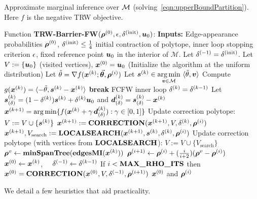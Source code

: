 \begin{algorithm}[t]
	\caption{Approximate marginal inference over $\mathcal{M}$ (solving~\eqref{eqn:upperBoundPartition}). Here $f$ is the negative TRW objective.}
	\label{alg:algInfadaptive}
	\begin{algorithmic}[1]
		\STATE Function \textbf{TRW-Barrier-FW}$(\bm{\rho}^{(0)}, \epsilon, \delta^{(\mathrm{init})},\bm{u}_0)$:
		\STATE \textbf{Inputs:} Edge-appearance probabilities $\bm{\rho}^{(0)}$, $\delta^{(\mathrm{init})}\leq \frac{1}{4}$ initial contraction of polytope, inner loop stopping criterion $\epsilon$, fixed reference point $\bm{u}_0$ in the interior of $\mathcal{M}$. Let $\delta^{(-1)} = \delta^{(\mathrm{init})}$.
		\STATE Let $V := \{\bm{u}_0\}$ (visited vertices),  $\bm{x}^{(0)} = \bm{u}_0$ \quad (Initialize the algorithm at the uniform distribution) 
			\STATE Let $\tilde{\theta} = \nabla f(\bm{x}^{(k)};\vec{\bm{\theta}},\bm{\rho}^{(i)})$ 
			\STATE Let $\bm{s}^{(k)} \in \displaystyle\operatorname*{\arg\min}_{\bm{v} \in \mathcal{M}} \,\, \langle\tilde{\theta},\bm{v}\rangle$  
			\STATE Compute $g(\bm{x}^{(k)})=\langle-\tilde{\theta},\bm{s}^{(k)}-\bm{x}^{(k)}\rangle$ 
			\IF{$\gk \leq \stopCrit$}
				\STATE \textbf{break} FCFW inner loop  
			\ENDIF
			\STATE $\delta^{(k)} = \delta^{(k-1)}$ 
			\STATE Let $\bm{s}^{(k)}_{(\delta)} = (1-\delta^{(k)})\bm{s}^{(k)} + \delta^{(k)} \bm{u}_0$ and $\bm{d}^{(k)}_{(\delta)} = \bm{s}^{(k)}_{(\delta)} - \bm{x}^{(k)}$
			\STATE $\bm{x}^{(k+1)} = \arg\min \{ f(\bm{x}^{(k)}+\gamma \, \bm{d}^{(k)}_{(\delta)}) : \gamma \in [0,1] \}$ 
			\STATE Update correction polytope: $V := V \cup \{ \bm{s}^{(k)} \}$
			\STATE $\bm{x}^{(k+1)} := \textbf{\textrm{CORRECTION}}(\bm{x}^{(k+1)}, V, \delta^{(k)}, \bm{\rho}^{(i)})$ 
			\STATE $\bm{x}^{(k+1)},V_{\mathrm{search}} := \textbf{\textrm{LOCALSEARCH}}(\bm{x}^{(k+1)}, \bm{s}^{(k)},\delta^{(k)}, \bm{\rho}^{(i)})$ 
			\STATE Update correction polytope (with vertices from $\textbf{\textrm{LOCALSEARCH}}$): $V := V \cup \{ V_{\mathrm{search}}\}$
		\ENDFOR
		\STATE $\bm{\rho}^{v} \leftarrow \textrm{\textbf{minSpanTree}}(\textbf{\textrm{edgesMI}}(\bm{x}^{(k)}))$ 
		\STATE $\bm{\rho}^{(i+1)} \leftarrow \bm{\rho}^{(i)}+(\frac{i}{i+2})(\bm{\rho}^{v}-\bm{\rho}^{(i)})$ 
		\STATE $\bm{x}^{(0)}\leftarrow\bm{x}^{(k)}$, $\quad \delta^{(-1)} \leftarrow \delta^{(k-1)}$ 
		\STATE If $i<\textbf{\textrm{MAX$\_$RHO$\_$ITS}}$ then $\bm{x}^{(0)} = \textbf{\textrm{CORRECTION}}(\bm{x}^{(0)},V,\delta^{(-1)},\bm{\rho}^{(i+1)})$ %
	\ENDFOR
	\RETURN $\bm{x}^{(0)}$ and $\bm{\rho}^{(i)}$
	\end{algorithmic}
\end{algorithm}
%
%
%
%
%
%
We detail a few heuristics that aid practicality. 

